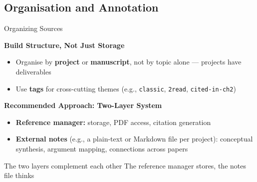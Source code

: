 \documentclass{beamer}
\begin{document}
\subsection{Organisation and Annotation}
\begin{frame}{Organizing Sources}

  \footnotesize
  \textbf{Build Structure, Not Just Storage}
  \begin{itemize}
    \item Organise by \textbf{project} or \textbf{manuscript},
      not by topic alone --- projects have deliverables
    \item Use \textbf{tags} for cross-cutting themes
      {\scriptsize (e.g., \texttt{classic},
      \texttt{2read}, \texttt{cited-in-ch2})}
  \end{itemize}

  \medskip
  \textbf{Recommended Approach: Two-Layer System}
  \begin{itemize}
    \item \textbf{Reference manager:} storage, PDF access, citation generation
    \item \textbf{External notes} (e.g., a plain-text or
      Markdown file per project): conceptual synthesis,
      argument mapping, connections across papers
  \end{itemize}
  \begin{block}{The two layers complement each other}
    The reference manager stores, the notes file thinks
  \end{block}
\end{frame}
\end{document}
